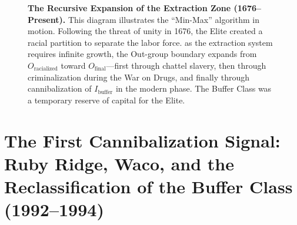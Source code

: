 \begin{figure}[h]
    \caption{\textbf{The Recursive Expansion of the Extraction Zone (1676--Present).} This diagram illustrates the ``Min-Max'' algorithm in motion. Following the threat of unity in 1676, the Elite created a racial partition to separate the labor force. as the extraction system requires infinite growth, the Out-group boundary expands from $O_{\text{racialized}}$ toward $O_{\text{final}}$---first through chattel slavery, then through criminalization during the War on Drugs, and finally through cannibalization of $I_{\text{buffer}}$ in the modern phase. The Buffer Class was a temporary reserve of capital for the Elite.}
    \label{fig:extraction_zone}
\end{figure}

\section{The First Cannibalization Signal: Ruby Ridge, Waco, and the Reclassification of the Buffer Class (1992--1994)}
\label{sec:ruby_ridge_waco}

